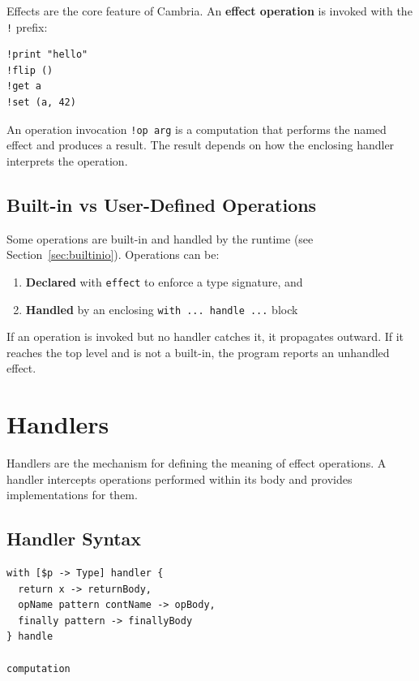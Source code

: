 \documentclass[11pt,a4paper]{article}
\newcommand{\cba}[1]{\lstinline[style=cbainline]{#1}}
\begin{document}
Effects are the core feature of Cambria.  An \textbf{effect operation} is
invoked with the \texttt{!} prefix:

\begin{lstlisting}
!print "hello"
!flip ()
!get a
!set (a, 42)
\end{lstlisting}

An operation invocation \texttt{!op arg} is a computation that performs the
named effect and produces a result.  The result depends on how the enclosing
handler interprets the operation.

\subsection{Built-in vs User-Defined Operations}

Some operations are built-in and handled by the runtime (see
Section~\ref{sec:builtinio}).  Operations can be:

\begin{enumerate}
  \item \textbf{Declared} with \cba{effect} to enforce a type signature, and
  \item \textbf{Handled} by an enclosing \cba{with ... handle ...} block
\end{enumerate}

If an operation is invoked but no handler catches it, it propagates outward.
If it reaches the top level and is not a built-in, the program reports an
unhandled effect.

\section{Handlers}
\label{sec:handlers}

Handlers are the mechanism for defining the meaning of effect operations.  A
handler intercepts operations performed within its body and provides
implementations for them.

\subsection{Handler Syntax}

\begin{lstlisting}
with [$p -> Type] handler {
  return x -> returnBody,
  opName pattern contName -> opBody,
  finally pattern -> finallyBody
} handle

computation
\end{lstlisting}
\end{document}
